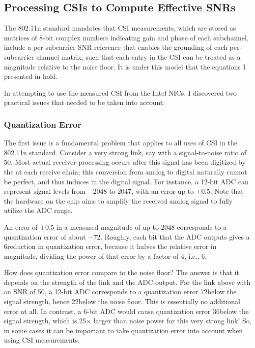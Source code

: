 \subsection{Processing CSIs to Compute Effective SNRs}
The 802.11n standard mandates that CSI measurements, which are stored as matrices of 8-bit complex numbers indicating gain and phase of each subchannel, include a per-subcarrier SNR reference that enables the grounding of each per-subcarrier channel matrix, such that each entry in the CSI can be treated as a magnitude relative to the noise floor. It is under this model that the equations I presented in  hold.

In attempting to use the measured CSI from the Intel NICs, I discovered two practical issues that needed to be taken into account.

\subsubsection{Quantization Error}
The first issue is a fundamental problem that applies to all uses of CSI in the 802.11n standard. Consider a very strong link, say with a signal-to-noise ratio of 50\dB. Most actual receiver processing occurs after this signal has been digitized by the  at each receive chain; this conversion from analog to digital naturally cannot be perfect, and thus induces  in the digital signal. For instance, a 12-bit ADC can represent signal levels from $-2048$ to $2047$, with an error up to $\pm0.5$. Note that the  hardware on the chip aims to amplify the received analog signal to fully utilize the ADC range.

An error of $\pm0.5$ in a measured magnitude of up to $2048$ corresponds to a quantization error of about $-72$\dB. Roughly, each bit that the ADC outputs gives a 6\dB reduction in quantization error, because it halves the relative error in magnitude, dividing the power of that error by a factor of 4, i.e., 6\dB.

How does quantization error compare to the noise floor? The answer is that it depends on the strength of the link and the ADC output. For the link above with an SNR of 50\dB, a 12-bit ADC corresponds to a quantization error 72\dB below the signal strength, hence 22\dB below the noise floor. This is essentially no additional error at all. In contrast, a 6-bit ADC would cause quantization error 36\dB below the signal strength, which is 25$\times$ larger than noise power for this very strong link! So, in some cases it can be important to take quantization error into account when using CSI measurements.

